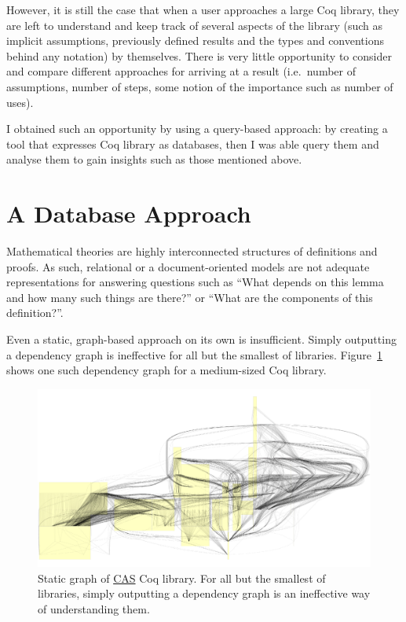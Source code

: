 However, it is still the case that when a user approaches a large Coq library, 
they are left to understand and keep track of several aspects of the
library (such as implicit assumptions, previously defined results and the
types and conventions behind any notation) by themselves. There is very little
opportunity to consider and compare different approaches for arriving at a
result (i.e.\ number of assumptions, number of steps, some notion of the
importance such as number of uses).

I obtained such an opportunity by using a query-based approach: by creating a
tool that expresses Coq library as databases, then I was able query them and
analyse them to gain insights such as those mentioned above.

\section{A Database Approach}

Mathematical theories are highly interconnected structures of definitions and
proofs. As such, relational or a document-oriented models are not adequate
representations for answering questions such as ``What depends on this lemma
and how many such things are there?'' or ``What are the components of this
definition?''.

Even a static, graph-based approach on its own is insufficient. Simply
outputting a dependency graph is ineffective for all but the smallest of
libraries. Figure~\ref{fig:static} shows one such dependency graph for a
medium-sized Coq library.

\begin{figure}[tp]

  \centering
  \includegraphics[width=\textwidth, page=1]{img/static-CAS-small.pdf}
  \caption{Static graph of
    \href{https://github.com/Timothy-G-Griffin/CAS}{CAS} Coq library. For all
    but the smallest of libraries, simply outputting a dependency graph is an
    ineffective way of understanding them.}\label{fig:static}

\end{figure}

